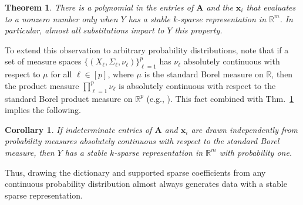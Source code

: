 \documentclass[journal, twocolumn]{IEEEtran}
\newtheorem{theorem}{Theorem}
\newtheorem{corollary}{Corollary}
\begin{document}
\begin{theorem}\label{robustPolythm}
There is a polynomial in the entries of $\mathbf{A}$ and the $\mathbf{x}_i$ that evaluates to a nonzero number only when $Y$ has a stable $k$-sparse representation in $\mathbb{R}^m$. In particular, almost all substitutions impart to $Y$ this property.
\end{theorem}

To extend this observation to arbitrary probability distributions, note that if a set of measure spaces $\{(X_{\ell}, \Sigma_{\ell}, \nu_{\ell})\}_{\ell=1}^p$ has $\nu_{\ell}$ absolutely continuous with respect to $\mu$ for all $\ell \in [p]$, where $\mu$ is the standard Borel measure on $\mathbb{R}$, then the product measure $\prod_{\ell=1}^p \nu_{\ell}$ is absolutely continuous with respect to the standard Borel product measure on $\mathbb{R}^p$ (e.g.,  \cite{folland2013real}).  This fact combined with Thm.~\ref{robustPolythm} implies the following.

\begin{corollary}\label{ProbabilisticCor}
If indeterminate entries of $\mathbf{A}$ and $\mathbf{x}_i$ are drawn independently from probability measures absolutely continuous with respect to the standard Borel measure, then $Y$ has a stable $k$-sparse representation in $\mathbb{R}^m$ with probability one.
\end{corollary}

Thus, drawing the dictionary and supported sparse coefficients from any continuous probability distribution almost always generates data with a stable sparse representation.

\end{document}
